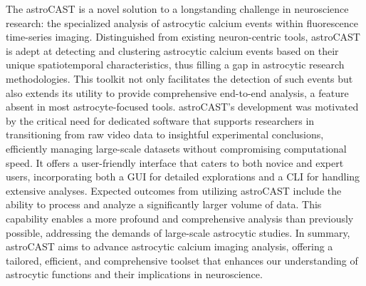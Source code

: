 The \ac{astroCAST} is a novel solution to a longstanding challenge in neuroscience research: the specialized analysis of astrocytic calcium events within fluorescence time-series imaging. Distinguished from existing neuron-centric tools, \ac{astroCAST} is adept at detecting and clustering astrocytic calcium events based on their unique spatiotemporal characteristics, thus filling a gap in astrocytic research methodologies. This toolkit not only facilitates the detection of such events but also extends its utility to provide comprehensive end-to-end analysis, a feature absent in most astrocyte-focused tools. \ac{astroCAST}'s development was motivated by the critical need for dedicated software that supports researchers in transitioning from raw video data to insightful experimental conclusions, efficiently managing large-scale datasets without compromising computational speed. It offers a user-friendly interface that caters to both novice and expert users, incorporating both a \ac{GUI} for detailed explorations and a \ac{CLI} for handling extensive analyses. Expected outcomes from utilizing \ac{astroCAST} include the ability to process and analyze a significantly larger volume of data. This capability enables a more profound and comprehensive analysis than previously possible, addressing the demands of large-scale astrocytic studies. In summary, \ac{astroCAST} aims to advance astrocytic calcium imaging analysis, offering a tailored, efficient, and comprehensive toolset that enhances our understanding of astrocytic functions and their implications in neuroscience.